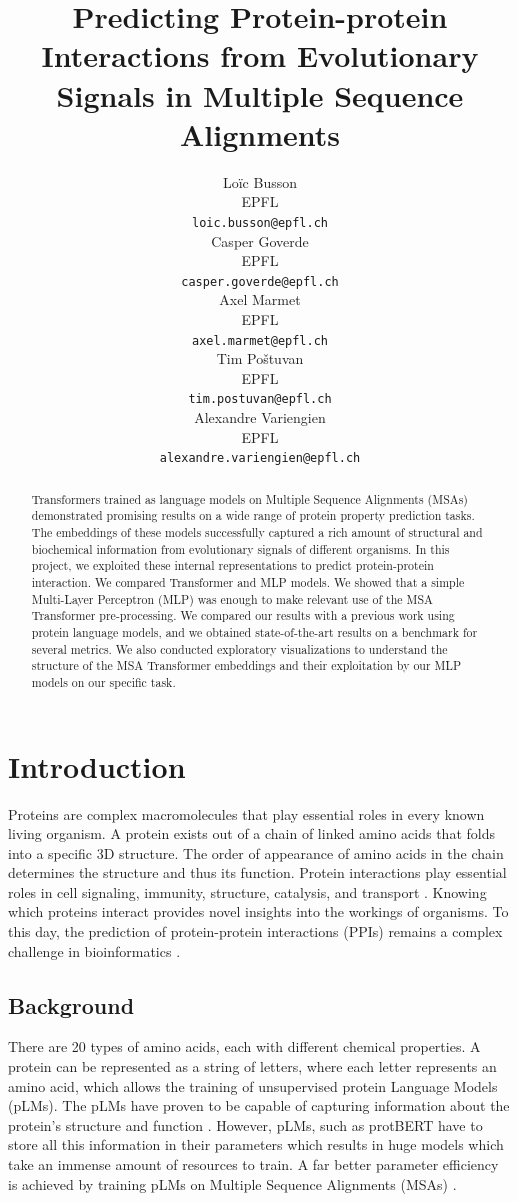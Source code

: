 \documentclass[11pt,a4paper]{article}
\title{Predicting Protein-protein Interactions from Evolutionary Signals in Multiple Sequence Alignments}
\author{Loïc Busson \\
  EPFL \\
  \texttt{loic.busson@epfl.ch} \\\And
  Casper Goverde \\
  EPFL \\
  \texttt{casper.goverde@epfl.ch} \\\AND
  Axel Marmet \\
  EPFL \\
  \texttt{axel.marmet@epfl.ch} \\\And
  Tim Poštuvan \\
  EPFL \\
  \texttt{tim.postuvan@epfl.ch} \\\AND
  Alexandre Variengien \\
  EPFL \\
  \texttt{alexandre.variengien@epfl.ch} \\
  }
\date{}
\begin{document}
\maketitle
\begin{abstract}
Transformers trained as language models on Multiple Sequence Alignments (MSAs) demonstrated promising results on a wide range of protein property prediction tasks. The embeddings of these models successfully captured a rich amount of structural and biochemical information from evolutionary signals of different organisms. In this project, we exploited these internal representations to predict protein-protein interaction. We compared Transformer and MLP models. We showed that a simple Multi-Layer Perceptron (MLP) was enough to make relevant use of the MSA Transformer pre-processing. We compared our results with a previous work using protein language models, and we obtained state-of-the-art results on a benchmark for several metrics. We also conducted exploratory visualizations to understand the structure of the MSA Transformer embeddings and their exploitation by our MLP models on our specific task.
\end{abstract}

\section{Introduction}
Proteins are complex macromolecules that play essential roles in every known living organism. A protein exists out of a chain of linked amino acids that folds into a specific 3D structure. The order of appearance of amino acids in the chain determines the structure and thus its function. Protein interactions play essential roles in cell signaling, immunity, structure, catalysis, and transport \cite{kuriyan2012molecules}. Knowing which proteins interact provides novel insights into the workings of organisms. To this day, the prediction of protein-protein interactions (PPIs) remains a complex challenge in bioinformatics \cite{sledzieski2021d}.


\subsection{Background}
There are 20 types of amino acids, each with different chemical properties. A protein can be represented as a string of letters, where each letter represents an amino acid, which allows the training of unsupervised protein Language Models (pLMs). The pLMs have proven to be capable of capturing information about the protein's structure and function \cite{alley2019unified,rao2020transformer}. However, pLMs, such as protBERT \cite{elnaggar2020prottrans} have to store all this information in their parameters which results in huge models which take an immense amount of resources to train. A far better parameter efficiency is achieved by training pLMs on Multiple Sequence Alignments (MSAs) \cite{rao2021msa}.
\end{document}
